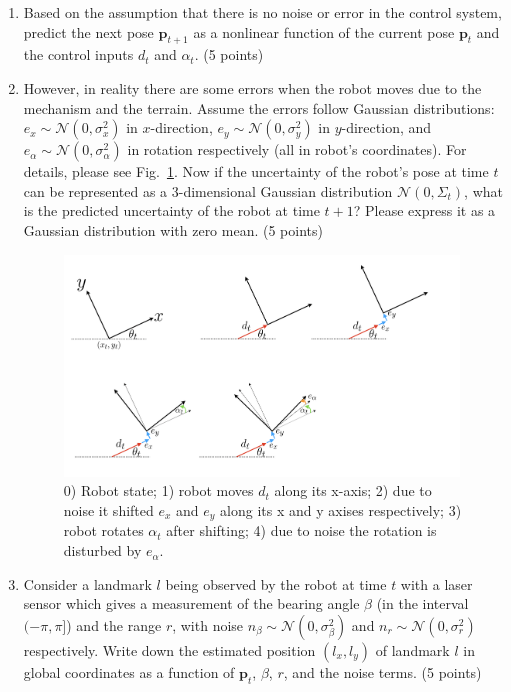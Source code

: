 \documentclass[12pt, a4paper]{article}
\begin{document}
\begin{enumerate}
\item Based on the assumption that there is no noise or error in the
control system, predict the next pose $\mathbf{p}_{t+1}$ as a nonlinear
function of the current pose $\mathbf{p}_{t}$ and the control inputs
$d_{t}$ and $\alpha_{t}$. (5 points) 

\item However, in reality there are some errors when the robot moves
due to the mechanism and the terrain. Assume the errors follow Gaussian
distributions: $e_{x}\sim\mathcal{N}\left(0,\sigma_{x}^{2}\right)$
in $x$-direction, $e_{y}\sim\mathcal{N}\left(0,\sigma_{y}^{2}\right)$
in $y$-direction, and $e_{\alpha}\sim\mathcal{N}\left(0,\sigma_{\alpha}^{2}\right)$
in rotation respectively (all in robot's coordinates). For details, please see Fig.~\ref{fig:1b}.
Now if the uncertainty of the robot's pose at time $t$ can be represented as
a 3-dimensional Gaussian distribution $\mathcal{N}\left(0,\Sigma_{t}\right)$,
what is the predicted uncertainty of the robot at time $t+1$? Please
express it as a Gaussian distribution with zero mean. (5 points)
\begin{figure}
    \centering
    \includegraphics[width=0.99\textwidth]{1b.png}
    \caption{0) Robot state; 1) robot moves $d_t$ along its x-axis;
    2) due to noise it shifted $e_x$ and $e_y$ along its x and y axises respectively;
    3) robot rotates $\alpha_t$ after shifting;    
    4) due to noise the rotation is disturbed by $e_\alpha$.}
    \label{fig:1b}
\end{figure}

\item Consider a landmark $l$ being observed by the robot at time $t$
with a laser sensor which gives a measurement of the bearing angle
$\beta$ (in the interval $(-\pi,\pi]$) and the range $r$, with
noise $n_{\beta}\sim\mathcal{N}\left(0,\sigma_{\beta}^{2}\right)$
and $n_{r}\sim\mathcal{N}\left(0,\sigma_{r}^{2}\right)$ respectively.
Write down the estimated position $\left(l_{x},l_{y}\right)$ of landmark
$l$ in global coordinates as a function of $\mathbf{p}_{t}$, $\beta$,
$r$, and the noise terms. (5 points)


\end{enumerate}
\end{document}
